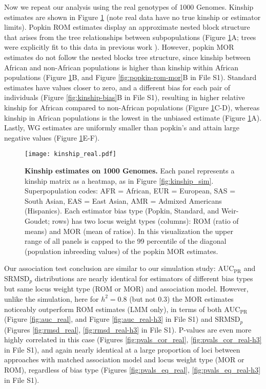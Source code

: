 \documentclass[9pt,twocolumn,twoside]{gsajnl}
\newcommand{\rmsd}{\text{SRMSD}_p}
\newcommand{\auc}{\text{AUC}_\text{PR}}
\begin{document}
Now we repeat our analysis using the real genotypes of 1000 Genomes.
Kinship estimates are shown in Figure \ref{fig:kinship_real} (note real data have no true kinship or estimator limits).
Popkin ROM estimates display an approximate nested block structure that arises from the tree relationships between subpopulations (Figure \ref{fig:kinship_real}A; trees were explicitly fit to this data in previous work \citep{yao_limitations_2022}).
However, popkin MOR estimates do not follow the nested blocks tree structure, since kinship between African and non-African populations is higher than kinship within African populations (Figure \ref{fig:kinship_real}B, and Figure \ref*{fig:popkin-rom-mor}B in File S1).
Standard estimates have values closer to zero, and a different bias for each pair of individuals (Figure \ref*{fig:kinship-bias}B in File S1), resulting in higher relative kinship for African compared to non-African populations (Figure \ref{fig:kinship_real}C-D), whereas kinship in African populations is the lowest in the unbiased estimate (Figure \ref{fig:kinship_real}A).
Lastly, WG estimates are uniformly smaller than popkin's and attain large negative values (Figure \ref{fig:kinship_real}E-F).

\begin{figure}[tb]
  \centering
  \texttt{[image: kinship\_real.pdf]}
  \caption{
    {\bf Kinship estimates on 1000 Genomes.}
    Each panel represents a kinship matrix as a heatmap, as in Figure \ref{fig:kinship_sim}.
    Superpopulation codes: AFR = African, EUR = European, SAS = South Asian, EAS = East Asian, AMR = Admixed Americans (Hispanics).
    Each estimator bias type (Popkin, Standard, and Weir-Goudet; rows) has two locus weight types (columns): ROM (ratio of means) and MOR (mean of ratios).
    In this visualization the upper range of all panels is capped to the 99 percentile of the diagonal (population inbreeding values) of the popkin MOR estimates.
  }
  \label{fig:kinship_real}
\end{figure}

Our association test conclusion are similar to our simulation study: $\auc$ and $\rmsd$ distributions are nearly identical for estimators of different bias types but same locus weight type (ROM or MOR) and association model.
However, unlike the simulation, here for $h^2=0.8$ (but not 0.3) the MOR estimates noticeably outperform ROM estimates (LMM only), in terms of both $\auc$ (Figure \ref{fig:auc_real}, and Figure \ref*{fig:auc_real-h3} in File S1) and $\rmsd$ (Figures \ref*{fig:rmsd_real}, \ref*{fig:rmsd_real-h3} in File S1).
P-values are even more highly correlated in this case (Figures \ref*{fig:pvals_cor_real}, \ref*{fig:pvals_cor_real-h3} in File S1), and again nearly identical at a large proportion of loci between approaches with matched association model and locus weight type (MOR or ROM), regardless of bias type (Figures \ref*{fig:pvals_eq_real}, \ref*{fig:pvals_eq_real-h3} in File S1).
\end{document}
